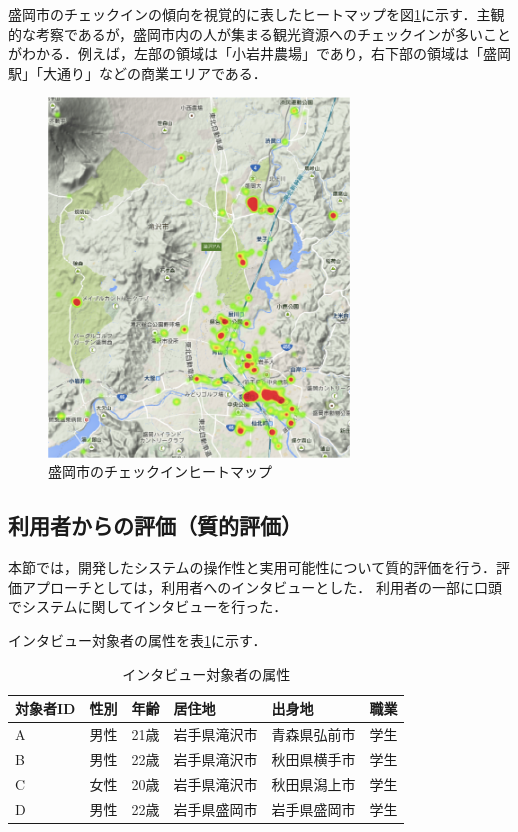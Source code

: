 \documentclass{jsarticle}
\begin{document}
盛岡市のチェックインの傾向を視覚的に表したヒートマップを図\ref{heatmap2}に示す．主観的な考察であるが，盛岡市内の人が集まる観光資源へのチェックインが多いことがわかる．例えば，左部の領域は「小岩井農場」であり，右下部の領域は「盛岡駅」「大通り」などの商業エリアである．

\begin{figure}[!ht]
\begin{center}
\includegraphics[width=8.0cm]{./image/heatmap2.png}
\caption{盛岡市のチェックインヒートマップ}
\label{heatmap2}
\end{center}
\end{figure}

\clearpage

\subsection{利用者からの評価（質的評価）}

本節では，開発したシステムの操作性と実用可能性について質的評価を行う．評価アプローチとしては，利用者へのインタビューとした．
利用者の一部に口頭でシステムに関してインタビューを行った．

インタビュー対象者の属性を表\ref{attribute_interview}に示す．

\begin{table}[ht!]
\small
\caption{インタビュー対象者の属性}
\begin{center}
\begin{tabular}{l|lllll}
\label{attribute_interview}
対象者ID & 性別 & 年齢 & 居住地 & 出身地 & 職業 \\ \hline
A      & 男性 & 21歳 & 岩手県滝沢市 & 青森県弘前市 & 学生 \\
B      & 男性 & 22歳 & 岩手県滝沢市 & 秋田県横手市 & 学生 \\
C      & 女性 & 20歳 & 岩手県滝沢市 & 秋田県潟上市 & 学生 \\
D      & 男性 & 22歳 & 岩手県盛岡市 & 岩手県盛岡市 & 学生 \\
\end{tabular}
\end{center}
\end{table}
\end{document}
